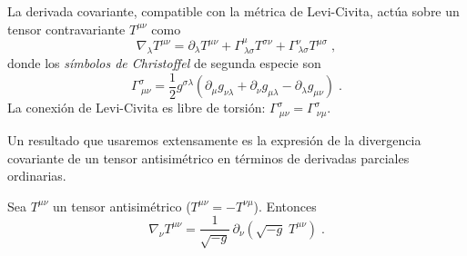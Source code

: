             \begin{myDef}
                La derivada covariante, compatible con la métrica de Levi-Civita, actúa sobre un tensor contravariante $T^{\mu\nu}$ como
                \begin{equation}\label{eq:DerCov}
                    \nabla_{\lambda}T^{\mu\nu}
                        = \partial_{\lambda}T^{\mu\nu}
                        + \Gamma^{\mu}_{\ \lambda\sigma}T^{\sigma\nu}
                        + \Gamma^{\nu}_{\ \lambda\sigma}T^{\mu\sigma}\;,
                \end{equation}
                donde los \emph{símbolos de Christoffel} de segunda especie son
                \begin{equation}\label{eq:Christoffel}
                    \Gamma^{\sigma}_{\ \mu\nu}
                        = \frac{1}{2}g^{\sigma\lambda}
                        \!\left(\partial_{\mu}g_{\nu\lambda}
                                +\partial_{\nu}g_{\mu\lambda}
                                -\partial_{\lambda}g_{\mu\nu}\right)\;.
                \end{equation}
                La conexión de Levi-Civita es libre de torsión:
                $\Gamma^{\sigma}_{\ \mu\nu} = \Gamma^{\sigma}_{\ \nu\mu}$.
            \end{myDef}

            Un resultado que usaremos extensamente es la expresión de la divergencia covariante de un tensor antisimétrico en términos de derivadas parciales ordinarias.

            \begin{myteo}\label{teo:DivCov} 
                Sea $T^{\mu\nu}$ un tensor antisimétrico ($T^{\mu\nu}=-T^{\nu\mu}$). Entonces
                \begin{equation}\label{eq:DivCovAntis}
                    \nabla_{\nu}T^{\mu\nu}
                        = \frac{1}{\sqrt{-g}}\,
                        \partial_{\nu}\!\left(\sqrt{-g}\;T^{\mu\nu}\right)\;.
                \end{equation}
            \end{myteo}

